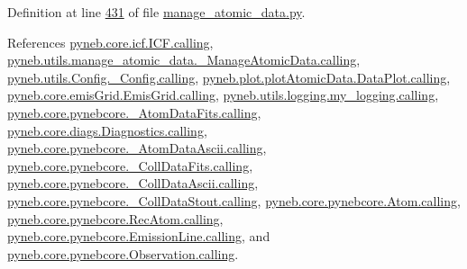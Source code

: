 Definition at line \hyperlink{manage__atomic__data_8py_source_l00431}{431} of file \hyperlink{manage__atomic__data_8py_source}{manage\-\_\-atomic\-\_\-data.\-py}.



References \hyperlink{icf_8py_source_l00016}{pyneb.\-core.\-icf.\-I\-C\-F.\-calling}, \hyperlink{manage__atomic__data_8py_source_l00018}{pyneb.\-utils.\-manage\-\_\-atomic\-\_\-data.\-\_\-\-Manage\-Atomic\-Data.\-calling}, \hyperlink{_config_8py_source_l00032}{pyneb.\-utils.\-Config.\-\_\-\-Config.\-calling}, \hyperlink{plot_atomic_data_8py_source_l00042}{pyneb.\-plot.\-plot\-Atomic\-Data.\-Data\-Plot.\-calling}, \hyperlink{emis_grid_8py_source_l00044}{pyneb.\-core.\-emis\-Grid.\-Emis\-Grid.\-calling}, \hyperlink{logging_8py_source_l00044}{pyneb.\-utils.\-logging.\-my\-\_\-logging.\-calling}, \hyperlink{pynebcore_8py_source_l00097}{pyneb.\-core.\-pynebcore.\-\_\-\-Atom\-Data\-Fits.\-calling}, \hyperlink{diags_8py_source_l00169}{pyneb.\-core.\-diags.\-Diagnostics.\-calling}, \hyperlink{pynebcore_8py_source_l00318}{pyneb.\-core.\-pynebcore.\-\_\-\-Atom\-Data\-Ascii.\-calling}, \hyperlink{pynebcore_8py_source_l00585}{pyneb.\-core.\-pynebcore.\-\_\-\-Coll\-Data\-Fits.\-calling}, \hyperlink{pynebcore_8py_source_l00936}{pyneb.\-core.\-pynebcore.\-\_\-\-Coll\-Data\-Ascii.\-calling}, \hyperlink{pynebcore_8py_source_l01156}{pyneb.\-core.\-pynebcore.\-\_\-\-Coll\-Data\-Stout.\-calling}, \hyperlink{pynebcore_8py_source_l01229}{pyneb.\-core.\-pynebcore.\-Atom.\-calling}, \hyperlink{pynebcore_8py_source_l02643}{pyneb.\-core.\-pynebcore.\-Rec\-Atom.\-calling}, \hyperlink{pynebcore_8py_source_l03385}{pyneb.\-core.\-pynebcore.\-Emission\-Line.\-calling}, and \hyperlink{pynebcore_8py_source_l03541}{pyneb.\-core.\-pynebcore.\-Observation.\-calling}.


